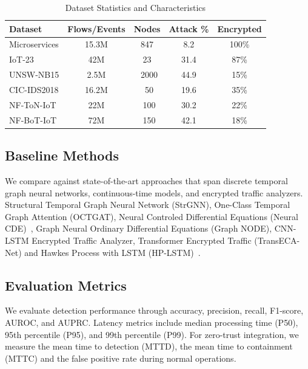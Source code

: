 \documentclass[lettersize,journal]{IEEEtran}
\begin{document}
\begin{table}[t]
\centering
\caption{Dataset Statistics and Characteristics}
\label{tab:datasets}
\begin{tabular}{lcccc}
\toprule
Dataset & Flows/Events & Nodes & Attack \% & Encrypted \\
\midrule
Microservices & 15.3M & 847 & 8.2 & 100\% \\
IoT-23 & 42M & 23 & 31.4 & 87\% \\
UNSW-NB15 & 2.5M & ~2000 & 44.9 & 15\% \\
CIC-IDS2018 & 16.2M & ~50 & 19.6 & 35\% \\
NF-ToN-IoT & 22M & ~100 & 30.2 & 22\% \\
NF-BoT-IoT & 72M & ~150 & 42.1 & 18\% \\
\bottomrule
\end{tabular}
\end{table}

\subsection{Baseline Methods}

We compare against state-of-the-art approaches that span discrete temporal graph neural networks, continuous-time models, and encrypted traffic analyzers. Structural Temporal Graph Neural Network (StrGNN), One-Class Temporal Graph Attention (OCTGAT), Neural Controled Differential Equations (Neural CDE)~\cite{kidger2020neural}, Graph Neural Ordinary Differential Equations (Graph NODE), CNN-LSTM Encrypted Traffic Analyzer, Transformer Encrypted Traffic (TransECA-Net) and Hawkes Process with LSTM (HP-LSTM)~\cite{gao2024hplstm}.

\subsection{Evaluation Metrics}

We evaluate detection performance through accuracy, precision, recall, F1-score, AUROC, and AUPRC. Latency metrics include median processing time (P50), 95th percentile (P95), and 99th percentile (P99). For zero-trust integration, we measure the mean time to detection (MTTD), the mean time to containment (MTTC) and the false positive rate during normal operations.
\end{document}
